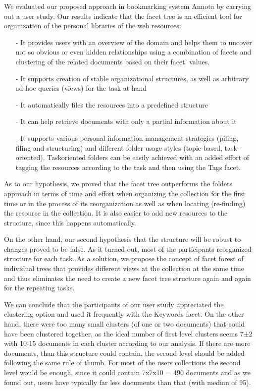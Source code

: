 \documentclass[12pt]{article}
\begin{document}
We evaluated our proposed approach in bookmarking system Annota by carrying out a user study. Our results indicate that the facet tree is an efficient tool for organization of the personal libraries of the web resources:

\begin{itemize}
        \item[-]It provides users with an overview of the domain and helps them to uncover not so obvious or even hidden relationships using a combination of facets and clustering of the related documents based on their facet’ values.
        \item[-]It supports creation of stable organizational structures, as well as arbitrary ad-hoc queries (views) for the task at hand
        \item[-]It automatically files the resources into a predefined structure
        \item[-]It can help retrieve documents with only a partial information about it
        \item[-]It supports various personal information management strategies (piling, filing and structuring) and different folder usage styles (topic-based, task-oriented). Taskoriented folders can be easily achieved with an added effort of tagging the resources according to the task and then using the Tags facet.
\end{itemize}

As to our hypothesis, we proved that the facet tree outperforms the folders approach in terms of time and effort when organizing the collection for the first time or in the process of its reorganization as well as when locating (re-finding) the resource in the collection. It is also easier to add new resources to the structure, since this happens automatically.  

On the other hand, our second hypothesis that the structure will be robust to changes proved to be false. As it turned out, most of the participants reorganized structure for each task. As a solution, we propose the concept of facet forest of individual trees that provides different views at the collection at the same time and thus eliminates the need to create a new facet tree structure again and again for the repeating tasks.

 We can conclude that the participants of our user study appreciated the clustering option and used it frequently with the Keywords facet. On the other hand, there were too many small clusters (of one or two documents) that could have been clustered together, as the ideal number of first level clusters seems 7±2 with 10-15 documents in each cluster according to our analysis. If there are more documents, than this structure could contain, the second level should be added following the same rule of thumb. For most of the users collections the second level would be enough, since it could contain 7x7x10 =  490 documents and as we found out, users have typically far less documents than that (with median of 95).
\end{document}
